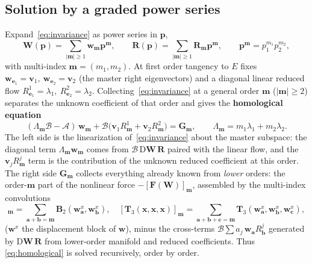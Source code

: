 \documentclass[11pt]{article}
\begin{document}
\subsection{Solution by a graded power series}
Expand~\eqref{eq:invariance} as power series in $\bm p$,
\begin{equation}
\bm W(\bm p)=\!\!\sum_{|\bm m|\ge1}\!\!\bm w_{\bm m}\bm p^{\bm m},\qquad
\bm R(\bm p)=\!\!\sum_{|\bm m|\ge1}\!\!\bm R_{\bm m}\bm p^{\bm m},\qquad
\bm p^{\bm m}=p_1^{m_1}p_2^{m_2},
\end{equation}
with multi-index $\bm m=(m_1,m_2)$. At first order tangency to $E$ fixes
$\bm w_{\bm e_1}=\bm v_1,\ \bm w_{\bm e_2}=\bm v_2$ (the master right
eigenvectors) and a diagonal linear reduced flow $R^1_{\bm e_1}=\lambda_1,\
R^2_{\bm e_2}=\lambda_2$. Collecting~\eqref{eq:invariance} at a general order
$\bm m$ ($|\bm m|\ge2$) separates the unknown coefficient of that order and gives
the \textbf{homological equation}
\begin{equation}
(\Lambda_{\bm m}\bm{\mathcal B}-\bm{\mathcal A})\,\bm w_{\bm m}
+\bm{\mathcal B}\big(\bm v_1 R^1_{\bm m}+\bm v_2 R^2_{\bm m}\big)
=\bm G_{\bm m},\qquad \Lambda_{\bm m}=m_1\lambda_1+m_2\lambda_2 .
\label{eq:homological}
\end{equation}
The left side is the linearization of~\eqref{eq:invariance} about the master
subspace: the diagonal term $\Lambda_{\bm m}\bm w_{\bm m}$ comes from
$\bm{\mathcal B}\,\mathrm D\bm W\,\bm R$ paired with the linear flow, and the
$\bm v_j R^j_{\bm m}$ term is the contribution of the unknown reduced coefficient
at this order. The right side $\bm G_{\bm m}$ collects everything already known
from \emph{lower} orders: the order-$\bm m$ part of the nonlinear force
$-[\bm F(\bm W)]_{\bm m}$, assembled by the multi-index convolutions
\begin{equation}
[\bm B_2(\bm x,\bm x)]_{\bm m}\!=\!\!\sum_{\bm a+\bm b=\bm m}\!\!
\bm B_2(\bm w^{x}_{\bm a},\bm w^{x}_{\bm b}),\quad
[\bm T_3(\bm x,\bm x,\bm x)]_{\bm m}\!=\!\!\!\sum_{\bm a+\bm b+\bm c=\bm m}\!\!\!
\bm T_3(\bm w^{x}_{\bm a},\bm w^{x}_{\bm b},\bm w^{x}_{\bm c}),
\end{equation}
($\bm w^{x}$ the displacement block of $\bm w$), minus the cross-terms
$\bm{\mathcal B}\sum a_j\,\bm w_{\bm a}R^j_{\bm b}$ generated by
$\mathrm D\bm W\,\bm R$ from lower-order manifold and reduced coefficients. Thus
\eqref{eq:homological} is solved recursively, order by order.
\end{document}
